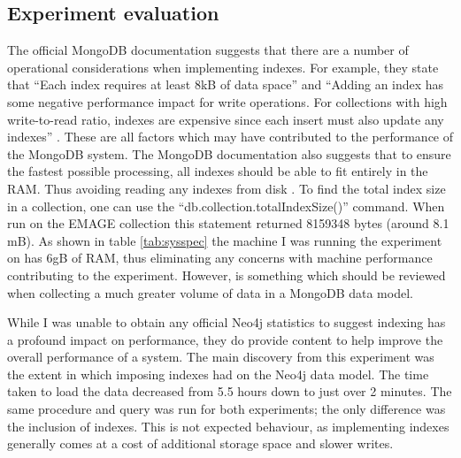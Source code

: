 \subsection{Experiment evaluation}\label{experimentdiscussion}
The official MongoDB documentation suggests that there are a number of operational considerations when implementing indexes. For example, they state that ``Each index requires at least 8kB of data space'' and ``Adding an index has some negative performance impact for write operations. For collections with high write-to-read ratio, indexes are expensive since each insert must also update any indexes'' \cite{mongdoc}. These are all factors which may have contributed to the performance of the MongoDB system. The MongoDB documentation also suggests that to ensure the fastest possible processing, all indexes should be able to fit entirely in the RAM. Thus avoiding reading any indexes from disk \cite{mongdoc}. To find the total index size in a collection, one can use the ``db.collection.totalIndexSize()'' command. When run on the EMAGE collection this statement returned 8159348 bytes (around 8.1 mB). As shown in table \ref{tab:sysspec} the machine I was running the experiment on has 6gB of RAM, thus eliminating any concerns with machine performance contributing to the experiment. However, is something which should be reviewed when collecting a much greater volume of data in a MongoDB data model.

While I was unable to obtain any official Neo4j statistics to suggest indexing has a profound impact on performance, they do provide content to help improve the overall performance of a system. The main discovery from this experiment was the extent in which imposing indexes had on the Neo4j data model. The time taken to load the data decreased from 5.5 hours down to just over 2 minutes. The same procedure and query was run for both experiments; the only difference was the inclusion of indexes. This is not expected behaviour, as implementing indexes generally comes at a cost of additional storage space and slower writes.

